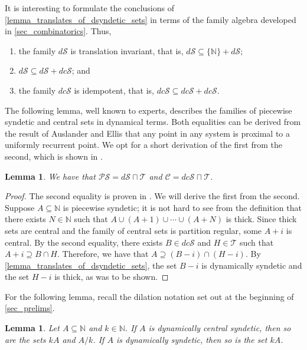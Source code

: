 \documentclass[letter,11pt]{article}
\theoremstyle{plain}
\newtheorem{lemma}[theorem]{Lemma}
\theoremstyle{definition}
\theoremstyle{plain}
\theoremstyle{plain}
\numberwithin{equation}{section}
\newcommand{\N}{\mathbb{N}}
\newcommand{\thick}{\mathcal{T}}
\newcommand{\dsyndetic}{d\mathcal{S}}
\newcommand{\dcsyndetic}{dc\mathcal{S}}
\newcommand{\PS}{\mathcal{PS}}
\newcommand{\central}{\mathcal{C}}
\newcommand{\classcap}{\sqcap}
\begin{document}
It is interesting to formulate the conclusions of \cref{lemma_translates_of_dsyndetic_sets} in terms of the family algebra developed in \cref{sec_combinatorics}. Thus,
\begin{enumerate}
    \item the family $\dsyndetic$ is translation invariant, that is, $\dsyndetic \subseteq \{\N\} + \dsyndetic$;
    \item $\dsyndetic \subseteq \dsyndetic + \dcsyndetic$; and
    \item the family $\dcsyndetic$ is idempotent, that is, $\dcsyndetic \subseteq \dcsyndetic + \dcsyndetic$.\\
\end{enumerate}

The following lemma, well known to experts, describes the families of piecewise syndetic and central sets in dynamical terms.  Both equalities can be derived from the result of Auslander \cite{auslander_1960} and Ellis \cite{ellis_1957} that any point in any system is proximal to a uniformly recurrent point.  We opt for a short derivation of the first from the second, which is shown in \cite{Huang_Shao_Ye_2019}.


\begin{lemma}
\label{lem:central_characterization}
We have that $\PS = \dsyndetic \classcap \thick$ and $\central = \dcsyndetic \classcap \thick$.
\end{lemma}


\begin{proof}
    The second equality is proven in \cite[Thm. 3.7]{Huang_Shao_Ye_2019}.  We will derive the first from the second.  Suppose $A \subseteq \N$ is piecewise syndetic; it is not hard to see from the definition that there exists $N \in \N$ such that $A \cup (A+1) \cup \cdots \cup (A+N)$ is thick.  Since thick sets are central and the family of central sets is partition regular, some $A+i$ is central.  By the second equality, there exists $B \in \dcsyndetic$ and $H \in \thick$ such that $A+i \supseteq B \cap H$.  Therefore, we have that $A \supseteq (B-i) \cap (H-i)$.  By \cref{lemma_translates_of_dsyndetic_sets}, the set $B-i$ is dynamically syndetic and the set $H-i$ is thick, as was to be shown.
\end{proof}

For the following lemma, recall the dilation notation set out at the beginning of \cref{sec_prelims}.

\begin{lemma}
\label{lemma_dilates_of_dsyndetic_sets}
    Let $A \subseteq \N$ and $k \in \N$. If $A$ is dynamically central syndetic, then so are the sets $kA$ and $A/k$.  If $A$ is dynamically syndetic, then so is the set $kA$.
\end{lemma}
\end{document}
